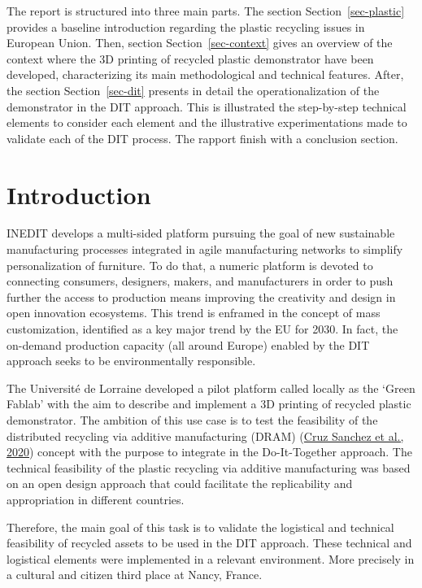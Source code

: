\documentclass[
  11pt,
]{article}
\begin{document}
The report is structured into three main parts. The section
Section~\ref{sec-plastic} provides a baseline introduction regarding the
plastic recycling issues in European Union. Then, section
Section~\ref{sec-context} gives an overview of the context where the 3D
printing of recycled plastic demonstrator have been developed,
characterizing its main methodological and technical features. After,
the section Section~\ref{sec-dit} presents in detail the
operationalization of the demonstrator in the DIT approach. This is
illustrated the step-by-step technical elements to consider each element
and the illustrative experimentations made to validate each of the DIT
process. The rapport finish with a conclusion section.

\newpage

\hypertarget{introduction}{%
\section{Introduction}\label{introduction}}

INEDIT develops a multi-sided platform pursuing the goal of new
sustainable manufacturing processes integrated in agile manufacturing
networks to simplify personalization of furniture. To do that, a numeric
platform is devoted to connecting consumers, designers, makers, and
manufacturers in order to push further the access to production means
improving the creativity and design in open innovation ecosystems. This
trend is enframed in the concept of mass customization, identified as a
key major trend by the EU for 2030. In fact, the on-demand production
capacity (all around Europe) enabled by the DIT approach seeks to be
environmentally responsible.

The Université de Lorraine developed a pilot platform called locally as
the `Green Fablab' with the aim to describe and implement a 3D printing
of recycled plastic demonstrator. The ambition of this use case is to
test the feasibility of the distributed recycling via additive
manufacturing (DRAM) (\protect\hyperlink{ref-CruzSanchez2020}{Cruz
Sanchez et al., 2020}) concept with the purpose to integrate in the
Do-It-Together approach. The technical feasibility of the plastic
recycling via additive manufacturing was based on an open design
approach that could facilitate the replicability and appropriation in
different countries.

Therefore, the main goal of this task is to validate the logistical and
technical feasibility of recycled assets to be used in the DIT approach.
These technical and logistical elements were implemented in a relevant
environment. More precisely in a cultural and citizen third place at
Nancy, France.
\end{document}
